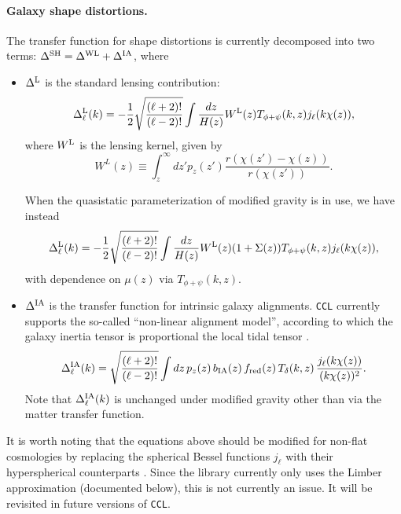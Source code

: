 \documentclass[\docopts]{\docclass}
\newcommand{\ccl}{{\tt CCL}\xspace}
\begin{document}
\paragraph{\bf Galaxy shape distortions.} The transfer function for shape distortions is currently decomposed into two terms: $\Delta^{\rm SH}=\Delta^{\rm WL}+\Delta^{\rm IA}$, where
\begin{itemize}
  \item $\Delta^{\rm L}$ is the standard lensing contribution:
        \begin{equation} \label{eq:transfer_lensing}
          \Delta_\ell^{\rm L}(k)=-\frac{1}{2}\sqrt{\frac{(\ell+2)!}{(\ell-2)!}}\int \frac{dz}{H(z)} W^{\rm L}(z) T_{\phi+\psi}(k,z) j_\ell(k\chi(z)),
        \end{equation}
        where $W^{\rm L}$ is the lensing kernel, given by
        \begin{equation}
          W^L(z)\equiv\int_z^\infty dz' p_z(z')\frac{r(\chi(z')-\chi(z))}{r(\chi(z'))}.
        \end{equation}
        
  When the quasistatic parameterization of modified gravity is in use, we have instead         
       \begin{equation} \label{eq:transfer_lensing}
          \Delta_\ell^{\rm L}(k)=-\frac{1}{2}\sqrt{\frac{(\ell+2)!}{(\ell-2)!}}\int \frac{dz}{H(z)} W^{\rm L}(z) (1 + \Sigma(z))T_{\phi+\psi}(k,z) j_\ell(k\chi(z)),
        \end{equation} 
        with dependence on $\mu(z)$ via $T_{\phi+\psi}(k,z)$.
  \item $\Delta^{\rm IA}$ is the transfer function for intrinsic galaxy alignments. \ccl currently supports the so-called ``non-linear alignment model'', according to which the galaxy inertia tensor is proportional the local tidal tensor \cite{2004PhRvD..70f3526H,2007MNRAS.381.1197H}.
        \begin{equation}
          \Delta_\ell^{\rm IA}(k)=\sqrt{\frac{(\ell+2)!}{(\ell-2)!}}\int dz\,p_z(z)\,b_{\rm IA}(z)\,f_{\rm red}(z)\,T_\delta(k,z)\,\frac{j_\ell(k\chi(z))}{(k\chi(z))^2}.
        \end{equation}
        Note that $\Delta_\ell^{\rm IA}(k)$ is unchanged under modified gravity other than via the matter transfer function.
\end{itemize}

It is worth noting that the equations above should be modified for non-flat cosmologies by replacing the spherical Bessel functions $j_\ell$ with their hyperspherical counterparts \cite{1994ApJ...432....7K}. Since the library currently only uses the Limber approximation (documented below), this is not currently an issue. It will be revisited in future versions of \ccl.
\end{document}
